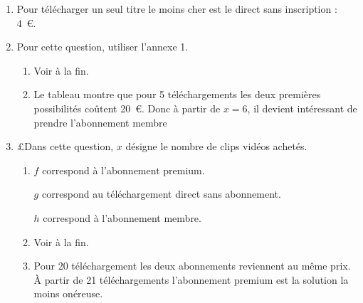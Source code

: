 \begin{enumerate}
\item %

Pour télécharger un seul titre le moins cher est le direct sans inscription : 4~\euro.
\item Pour cette question, utiliser l'annexe 1.
	\begin{enumerate}
		\item %
Voir à la fin.
		\item %
		Le tableau montre que pour 5 téléchargements les deux premières possibilités coûtent 20~\euro. Donc à partir de $x = 6$, il devient intéressant de prendre l’abonnement membre
	\end{enumerate}
\item £Dans cette question, $x$ désigne le nombre de clips vidéos achetés.
	
	

	\begin{enumerate}
		\item %
$f$ correspond à l’abonnement premium.

$g$ correspond au téléchargement direct sans abonnement.

$h$ correspond à l’abonnement membre.
		\item %
Voir à la fin.
		\item %
		Pour 20 téléchargement les deux abonnements reviennent au même prix. À partir de 21 téléchargements l’abonnement premium est la solution la moins onéreuse.
	\end{enumerate}
\end{enumerate}

\vspace{0,5cm}

